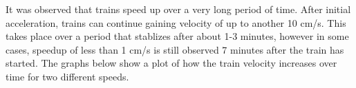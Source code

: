 \documentclass[letterpaper]{article}
\begin{document}
It was observed that trains speed up over a very long period of time.  After initial acceleration, trains can continue gaining velocity of up to another 10 cm/s.  This takes place over a period that stablizes after about 1-3 minutes, however in some cases, speedup of less than 1 cm/s is still observed 7 minutes after the train has started.  The graphs below show a plot of how the train velocity increases over time for two different speeds.
\begin{figure}
\noindent{}
\end{figure}
\begin{figure}
\noindent{}
\end{figure}
\end{document}
